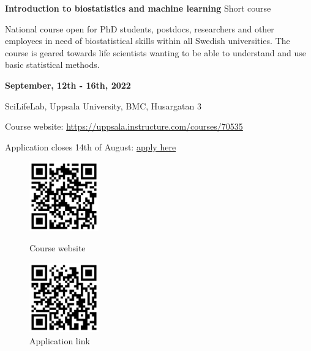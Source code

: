\documentclass[12pt]{article}\usepackage[]{graphicx}\usepackage[]{color}
\begin{document}

\Huge
\textbf{Introduction to biostatistics and machine learning} %
\normalsize
Short course

National course open for PhD students, postdocs, researchers and other employees in need of biostatistical skills within all Swedish universities. The course is geared towards life scientists wanting to be able to understand and use basic statistical methods. 

\LARGE
\vspace{0.5cm}
\textbf{September, 12th - 16th, 2022} %

\normalsize
SciLifeLab, Uppsala University, BMC, Husargatan 3 %


\vspace{0.5cm}

\Large
\vspace{0.5cm}
Course website:
\href{https://uppsala.instructure.com/courses/70535}{https://uppsala.instructure.com/courses/70535}


\Large
Application closes 14th of August: \href{https://forms.gle/bZGvTiMyTzf2Hpx1A}{apply here}

\vspace{0.5cm}
\begin{figure}[H]
  \begin{minipage}[c]{0.4\linewidth}
  \includegraphics[width=3cm, height=3cm, center]{QR-code.png}
  \caption*{Course website}
  \end{minipage}\hfill
  \begin{minipage}[c]{0.4\linewidth}
  \includegraphics[width=3cm, height=3cm, center]{QR-application.png}
  \caption*{Application link}
  \end{minipage}
  
\end{figure}
\end{document}
